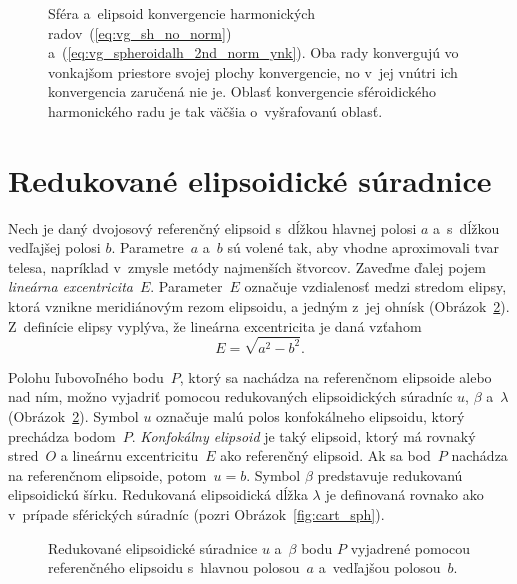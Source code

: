 \documentclass[a4paper,12pt]{book}
\begin{document}
\begin{figure}
\centering

\caption{Sféra a~elipsoid konvergencie harmonických 
radov~(\ref{eq:vg_sh_no_norm}) a~(\ref{eq:vg_spheroidalh_2nd_norm_ynk}).  Oba 
rady konvergujú vo vonkajšom priestore svojej plochy konvergencie, no v~jej 
vnútri ich konvergencia zaručená nie je.  Oblasť konvergencie sféroidického 
harmonického radu je tak väčšia o~vyšrafovanú oblasť.}
\label{fig:spheroidal_harmonics_convergence}
\end{figure}


\section{Redukované elipsoidické súradnice}
\label{sec:reduced_ell_coords}

Nech je daný dvojosový referenčný elipsoid s~dĺžkou hlavnej polosi $a$ 
a~s~dĺžkou vedľajšej polosi $b$.  Parametre~$a$ a~$b$ sú volené tak, aby vhodne 
aproximovali tvar telesa, napríklad v~zmysle metódy najmenších štvorcov.  
Zaveďme ďalej pojem \emph{lineárna excentricita}~$E$.  Parameter~$E$ označuje 
vzdialenosť medzi stredom elipsy, ktorá vznikne meridiánovým rezom elipsoidu, 
a jedným z~jej ohnísk (Obrázok~\ref{fig:reduced_ell_coords}).  Z~definície 
elipsy vyplýva, že lineárna excentricita je daná vzťahom
%
\begin{equation}
\label{eq:linear_eccentricity}
E = \sqrt{a^2 - b^2}{.}
\end{equation}

Polohu ľubovoľného bodu~$P$, ktorý sa nachádza na referenčnom elipsoide alebo 
nad ním, možno vyjadriť pomocou redukovaných elipsoidických súradníc $u$, 
$\beta$ a~$\lambda$ (Obrázok~\ref{fig:reduced_ell_coords}).  Symbol $u$ 
označuje malú polos konfokálneho elipsoidu, ktorý prechádza bodom~$P$.  
\emph{Konfokálny elipsoid} je taký elipsoid, ktorý má rovnaký stred~$O$ 
a lineárnu excentricitu~$E$ ako referenčný elipsoid.  Ak sa bod~$P$ nachádza na 
referenčnom elipsoide, potom~$u = b$.  Symbol $\beta$ predstavuje redukovanú 
elipsoidickú šírku.  Redukovaná elipsoidická dĺžka $\lambda$ je definovaná 
rovnako ako v~prípade sférických súradníc (pozri Obrázok~\ref{fig:cart_sph}).

\begin{figure}
\centering

\caption{Redukované elipsoidické súradnice $u$ a~$\beta$ bodu $P$ vyjadrené 
pomocou referenčného elipsoidu s~hlavnou polosou~$a$ a~vedľajšou polosou~$b$.}
\label{fig:reduced_ell_coords}
\end{figure}
\end{document}
